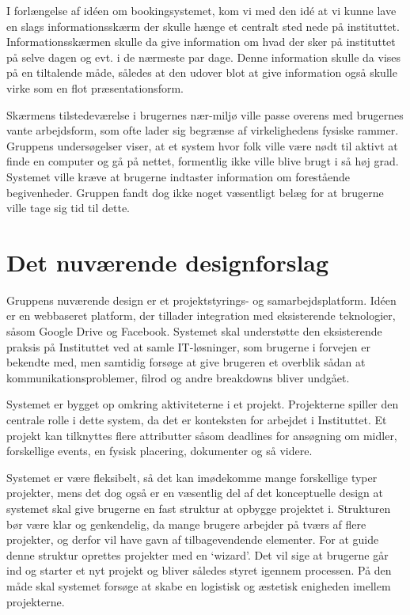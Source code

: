 I forlængelse af idéen om bookingsystemet, kom vi med den idé at vi kunne lave en slags informationsskærm der skulle hænge et centralt sted nede på instituttet. Informationsskærmen skulle da give information om hvad der sker på instituttet på selve dagen og evt. i de nærmeste par dage. Denne information skulle da vises på en tiltalende måde, således at den udover blot at give information også skulle virke som en flot præsentationsform. 

Skærmens tilstedeværelse i brugernes nær-miljø ville passe overens med brugernes vante arbejdsform, som ofte lader sig begrænse af virkelighedens fysiske rammer. Gruppens undersøgelser viser, at et system hvor folk ville være nødt til aktivt at finde en computer og gå på nettet, formentlig ikke ville blive brugt i så høj grad. Systemet ville kræve at brugerne indtaster information om forestående begivenheder. Gruppen fandt dog ikke noget væsentligt belæg for at brugerne ville tage sig tid til dette.

\section{Det nuværende designforslag}
Gruppens nuværende design er et projektstyrings- og samarbejdsplatform.
Idéen er en webbaseret platform, der tillader integration med eksisterende teknologier, såsom Google Drive og Facebook. Systemet skal understøtte den eksisterende praksis på Instituttet ved at samle IT-løsninger, som brugerne i forvejen er bekendte med, men samtidig forsøge at give brugeren et overblik sådan at kommunikationsproblemer, filrod og andre breakdowns bliver undgået. 

Systemet er bygget op omkring aktiviteterne i et projekt. Projekterne spiller den centrale rolle i dette system, da det er konteksten for arbejdet i Instituttet. Et projekt kan tilknyttes flere attributter såsom deadlines for ansøgning om midler, forskellige events, en fysisk placering, dokumenter og så videre.

Systemet er være fleksibelt, så det kan imødekomme mange forskellige typer projekter, mens det dog også er en væsentlig del af det konceptuelle design at systemet skal give brugerne en fast struktur at opbygge projektet i. Strukturen bør være klar og genkendelig, da mange brugere arbejder på tværs af flere projekter, og derfor vil have gavn af tilbagevendende elementer.
For at guide denne struktur oprettes projekter med en ‘wizard’. Det vil sige at brugerne går ind og starter et nyt projekt og bliver således styret igennem processen. På den måde skal systemet forsøge at skabe en logistisk og æstetisk enigheden imellem projekterne. 

